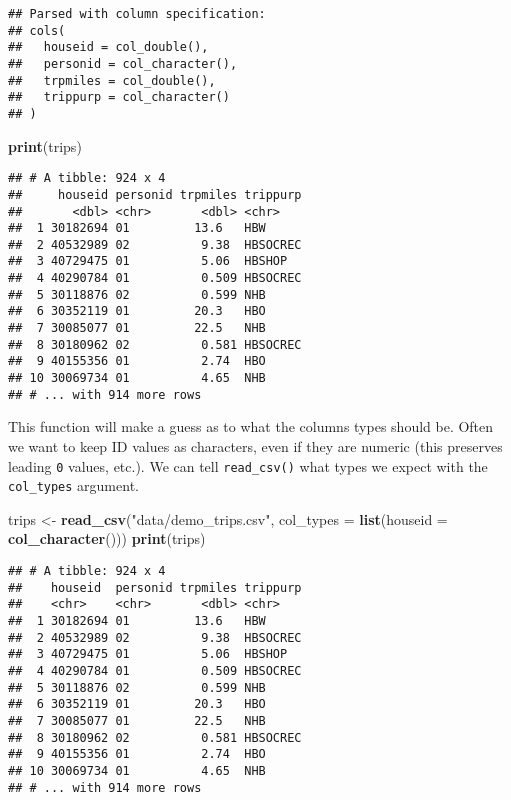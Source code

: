 \documentclass[]{book}
\newenvironment{Shaded}{\begin{snugshade}}{\end{snugshade}}
\newcommand{\DataTypeTok}[1]{\textcolor[rgb]{0.13,0.29,0.53}{#1}}
\newcommand{\KeywordTok}[1]{\textcolor[rgb]{0.13,0.29,0.53}{\textbf{#1}}}
\newcommand{\NormalTok}[1]{#1}
\newcommand{\StringTok}[1]{\textcolor[rgb]{0.31,0.60,0.02}{#1}}
\begin{document}
\begin{verbatim}
## Parsed with column specification:
## cols(
##   houseid = col_double(),
##   personid = col_character(),
##   trpmiles = col_double(),
##   trippurp = col_character()
## )
\end{verbatim}

\begin{Shaded}
\begin{Highlighting}[]
\KeywordTok{print}\NormalTok{(trips)}
\end{Highlighting}
\end{Shaded}

\begin{verbatim}
## # A tibble: 924 x 4
##     houseid personid trpmiles trippurp
##       <dbl> <chr>       <dbl> <chr>   
##  1 30182694 01         13.6   HBW     
##  2 40532989 02          9.38  HBSOCREC
##  3 40729475 01          5.06  HBSHOP  
##  4 40290784 01          0.509 HBSOCREC
##  5 30118876 02          0.599 NHB     
##  6 30352119 01         20.3   HBO     
##  7 30085077 01         22.5   NHB     
##  8 30180962 02          0.581 HBSOCREC
##  9 40155356 01          2.74  HBO     
## 10 30069734 01          4.65  NHB     
## # ... with 914 more rows
\end{verbatim}

This function will make a guess as to what the columns types should be. Often
we want to keep ID values as characters, even if they are numeric (this preserves
leading \texttt{0} values, etc.). We can tell \texttt{read\_csv()} what types we expect with
the \texttt{col\_types} argument.

\begin{Shaded}
\begin{Highlighting}[]
\NormalTok{trips <-}\StringTok{ }\KeywordTok{read_csv}\NormalTok{(}\StringTok{"data/demo_trips.csv"}\NormalTok{, }\DataTypeTok{col_types =} \KeywordTok{list}\NormalTok{(}\DataTypeTok{houseid =} \KeywordTok{col_character}\NormalTok{()))}
\KeywordTok{print}\NormalTok{(trips)}
\end{Highlighting}
\end{Shaded}

\begin{verbatim}
## # A tibble: 924 x 4
##    houseid  personid trpmiles trippurp
##    <chr>    <chr>       <dbl> <chr>   
##  1 30182694 01         13.6   HBW     
##  2 40532989 02          9.38  HBSOCREC
##  3 40729475 01          5.06  HBSHOP  
##  4 40290784 01          0.509 HBSOCREC
##  5 30118876 02          0.599 NHB     
##  6 30352119 01         20.3   HBO     
##  7 30085077 01         22.5   NHB     
##  8 30180962 02          0.581 HBSOCREC
##  9 40155356 01          2.74  HBO     
## 10 30069734 01          4.65  NHB     
## # ... with 914 more rows
\end{verbatim}
\end{document}
